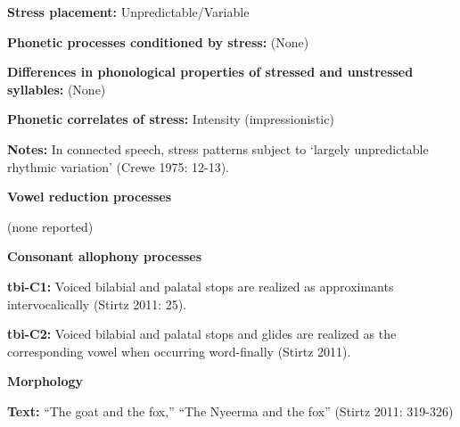 \begin{styleBody}
\textbf{Stress placement:} Unpredictable/Variable
\end{styleBody}

\begin{styleBody}
\textbf{Phonetic processes conditioned by stress:} (None)
\end{styleBody}

\begin{styleBody}
\textbf{Differences in phonological properties of stressed and unstressed syllables:} (None)
\end{styleBody}

\begin{styleBody}
\textbf{Phonetic correlates of stress: }Intensity (impressionistic)
\end{styleBody}

\begin{styleBody}
\textbf{Notes:} In connected speech, stress patterns subject to ‘largely unpredictable rhythmic variation’ (Crewe 1975: 12-13).
\end{styleBody}

\begin{styleBody}
\textbf{Vowel reduction processes}
\end{styleBody}

\begin{styleBody}
(none reported)
\end{styleBody}

\begin{styleBody}
\textbf{Consonant allophony processes}
\end{styleBody}

\begin{styleBody}
\textbf{tbi-C1: }Voiced bilabial and palatal stops are realized as approximants intervocalically (Stirtz 2011: 25).
\end{styleBody}

\begin{styleBody}
\textbf{tbi-C2: }Voiced bilabial and palatal stops and glides are realized as the corresponding vowel when occurring word-finally (Stirtz 2011).
\end{styleBody}

\begin{styleBody}
\textbf{Morphology}
\end{styleBody}

\begin{styleBody}
\textbf{Text:} “The goat and the fox,” “The Nyeerma and the fox” (Stirtz 2011: 319-326)
\end{styleBody}

